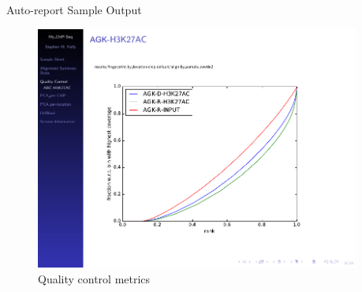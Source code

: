 \documentclass[final]{beamer}
\newlength{\onecolwid}
\newlength{\twocolwid}
\begin{document}
\begin{frame}[t]
\begin{columns}[t]
\begin{column}{\twocolwid}
\begin{columns}[t,totalwidth=\twocolwid]
\begin{column}{\onecolwid}
\begin{beamerboxesrounded}{Auto-report Sample Output}
\begin{figure}
\includegraphics[width=1.0\linewidth, frame]{./Figures/fingerprint}
\caption{Quality control metrics}
\label{fig:fingerprint}
\end{figure}



\end{beamerboxesrounded}\hfill


\end{column} %

\begin{column}{\onecolwid}%

%	

\begin{beamerboxesrounded}{\phantom{Auto-report Output}}



\end{beamerboxesrounded}
\end{column}
\end{columns}
\end{column}
\end{columns}
\end{frame}
\end{document}
